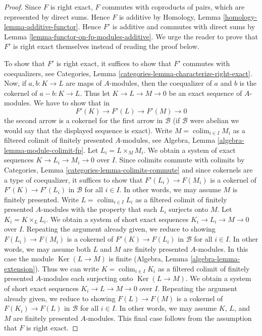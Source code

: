 \documentclass[10pt,a4paper]{amsart}
\theoremstyle{plain}
\theoremstyle{definition}
\theoremstyle{remark}
\numberwithin{equation}{subsection}
\def\colim{\mathop{\mathrm{colim}}\nolimits}
\def\Ker{\mathop{\mathrm{Ker}}}
\begin{document}
\begin{proof}
Since $F$ is right exact, $F$ commutes with coproducts of pairs, which are
represented by direct sums. Hence $F$ is additive by
Homology, Lemma \ref{homology-lemma-additive-functor}.
Hence $F'$ is additive and commutes with direct sums by
Lemma \ref{lemma-functor-on-fp-modules-additive}.
We urge the reader to prove that $F'$ is right exact themselves
instead of reading the proof below.

\medskip\noindent
To show that $F'$ is right exact, it suffices to show that $F'$ commutes
with coequalizers, see
Categories, Lemma \ref{categories-lemma-characterize-right-exact}.
Now, if $a, b : K \to L$ are maps of $A$-modules, then the
coequalizer of $a$ and $b$ is the cokernel of $a - b : K \to L$.
Thus let $K \to L \to M \to 0$ be an exact sequence
of $A$-modules. We have to show that in
$$
F'(K) \to F'(L) \to F'(M) \to 0
$$
the second arrow is a cokernel for the first arrow in $\mathcal{B}$
(if $\mathcal{B}$ were abelian we would say that the displayed sequence
is exact).
Write $M = \colim_{i \in I} M_i$ as a filtered colimit of finitely
presented $A$-modules, see
Algebra, Lemma \ref{algebra-lemma-module-colimit-fp}.
Let $L_i = L \times_M M_i$. 
We obtain a system of exact sequences $K \to L_i \to M_i \to 0$ over $I$.
Since colimits commute with colimits by
Categories, Lemma \ref{categories-lemma-colimits-commute}
and since cokernels are a type of coequalizer,
it suffices to show that $F'(L_i) \to F(M_i)$ is a cokernel of
$F'(K) \to F'(L_i)$ in $\mathcal{B}$ for all $i \in I$. In other words, we may
assume $M$ is finitely presented. Write $L = \colim_{i \in I} L_i$
as a filtered colimit of finitely presented $A$-modules
with the property that each $L_i$ surjects onto $M$.
Let $K_i = K \times_L L_i$. We obtain a system of short exact sequences
$K_i \to L_i \to M \to 0$ over $I$.
Repeating the argument already given, we reduce to showing
$F(L_i) \to F(M_i)$ is a cokernel of
$F'(K) \to F(L_i)$ in $\mathcal{B}$ for all $i \in I$.
In other words, we may assume both
$L$ and $M$ are finitely presented $A$-modules.
In this case the module $\Ker(L \to M)$ is finite
(Algebra, Lemma \ref{algebra-lemma-extension}).
Thus we can write $K = \colim_{i \in I} K_i$ as a filtered colimit
of finitely presented $A$-modules each surjecting onto $\Ker(L \to M)$.
We obtain a system of short exact sequences
$K_i \to L \to M \to 0$ over $I$.
Repeating the argument already given, we reduce to showing
$F(L) \to F(M)$ is a cokernel of
$F(K_i) \to F(L)$ in $\mathcal{B}$ for all $i \in I$.
In other words, we may assume $K$, $L$, and $M$
are finitely presented $A$-modules. This final case follows
from the assumption that $F$ is right exact.
\end{proof}
\end{document}

